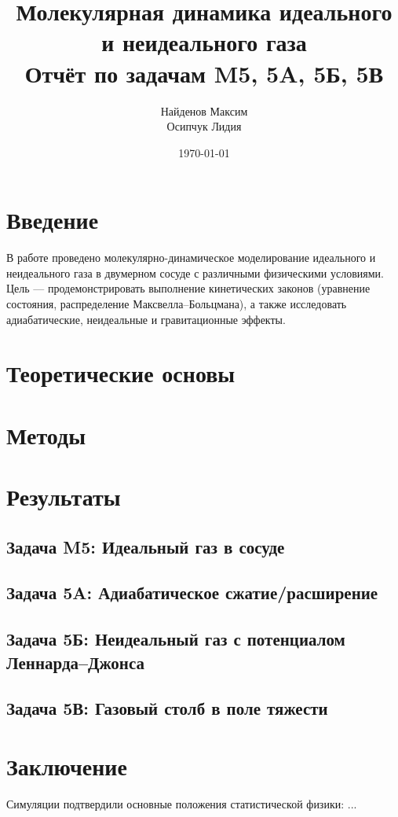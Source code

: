 \documentclass[12pt,a4paper]{article}
\title{Молекулярная динамика идеального и неидеального газа \\
       \large{Отчёт по задачам M5, 5A, 5Б, 5В}}
\author{Найденов Максим \\ Осипчук Лидия}
\date{\today}
\begin{document}
\maketitle

\tableofcontents
\newpage

\section{Введение}
В работе проведено молекулярно-динамическое моделирование идеального и неидеального газа в двумерном сосуде с различными физическими условиями. 
Цель --- продемонстрировать выполнение кинетических законов (уравнение состояния, распределение Максвелла--Больцмана), а также исследовать адиабатические, неидеальные и гравитационные эффекты.

\section{Теоретические основы}


\section{Методы}


\section{Результаты}
\subsection{Задача M5: Идеальный газ в сосуде}
\subsection{Задача 5A: Адиабатическое сжатие/расширение}
\subsection{Задача 5Б: Неидеальный газ с потенциалом Леннарда--Джонса}
\subsection{Задача 5В: Газовый столб в поле тяжести}

\section{Заключение}
Симуляции подтвердили основные положения статистической физики: ...
\end{document}
